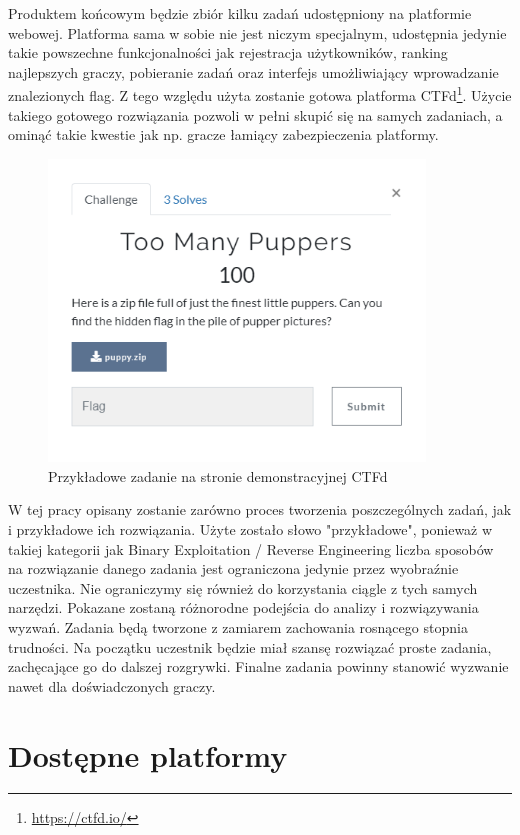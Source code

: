 \documentclass[language=polish,type=eng]{aghmodern}
\begin{document}
Produktem końcowym będzie zbiór kilku zadań udostępniony na platformie webowej.
Platforma sama w sobie nie jest niczym specjalnym, udostępnia jedynie takie powszechne
funkcjonalności jak rejestracja użytkowników, ranking najlepszych graczy,
pobieranie zadań oraz interfejs umożliwiający wprowadzanie znalezionych
flag. Z tego względu użyta zostanie gotowa platforma CTFd\footnote{\url{https://ctfd.io/}}.
Użycie takiego gotowego rozwiązania pozwoli w pełni skupić się na samych zadaniach,
a ominąć takie kwestie jak np. gracze łamiący zabezpieczenia platformy.

\begin{figure}[H]
\centering
\includegraphics[width=10cm]{ctfd}
\caption{Przykładowe zadanie na stronie demonstracyjnej CTFd}
\end{figure}

W tej pracy opisany zostanie zarówno proces tworzenia poszczególnych zadań,
jak i przykładowe ich rozwiązania. Użyte zostało słowo "przykładowe", ponieważ
w takiej kategorii jak Binary Exploitation / Reverse Engineering liczba sposobów
na rozwiązanie danego zadania jest ograniczona jedynie przez wyobraźnie uczestnika.
Nie ograniczymy się również do korzystania ciągle z tych samych narzędzi.
Pokazane zostaną różnorodne podejścia do analizy i rozwiązywania wyzwań.
Zadania będą tworzone z zamiarem zachowania rosnącego stopnia trudności.
Na początku uczestnik będzie miał szansę rozwiązać proste zadania,
zachęcające go do dalszej rozgrywki. Finalne zadania powinny stanowić wyzwanie
nawet dla doświadczonych graczy.

\section{Dostępne platformy}
\end{document}
